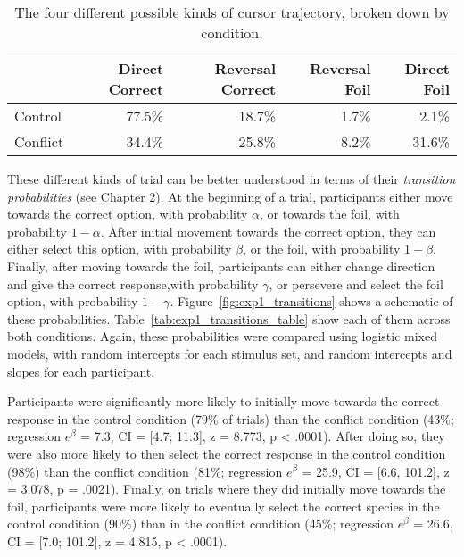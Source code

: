 \begin{table}
  \centering
  \begin{tabular}{lrrrr}
    \toprule
             & Direct Correct & Reversal Correct & Reversal Foil & Direct Foil\\
    \midrule
    Control  & 77.5\%         & 18.7\%           & 1.7\%         & 2.1\%\\
    Conflict & 34.4\%         & 25.8\%           & 8.2\%         & 31.6\%\\
    \bottomrule
  \end{tabular}
  \caption[Kinds of trajectory in Experiment 1.]{
    The four different possible kinds of cursor trajectory,
    broken down by condition.
    \label{tbl:exp1_trajectories}}
\end{table}

These different kinds of trial can be better understood
in terms of their \emph{transition probabilities} (see Chapter 2).
At the beginning of a trial, participants either move towards the correct option,
with probability $\alpha$, or towards the foil, with probability $1 - \alpha$.
After initial movement towards the correct option, they can either
select this option, with probability $\beta$, or the foil, with probability $1 - \beta$.
Finally, after moving towards the foil, participants can either
change direction and give the correct response,with probability $\gamma$,
or persevere and select the foil option, with probability $1 - \gamma$.
Figure~\ref{fig:exp1_transitions} shows
a schematic of these probabilities.
Table~\ref{tab:exp1_transitions_table}
show each of them across both conditions.
Again, these probabilities were compared using logistic mixed models,
with random intercepts for each stimulus set,
and random intercepts and slopes for each participant.

Participants were significantly more likely to
initially move towards the correct response in the control condition
(79\% of trials)
than the conflict condition (43\%;
regression $e^{\beta}$ = 7.3, CI = [4.7; 11.3], z = 8.773, p < .0001).
After doing so, they were also more likely to then select the correct response
in the control condition (98\%) than the conflict condition
(81\%; regression $e^{\beta}$ = 25.9, CI = [6.6, 101.2],
z = 3.078, p = .0021).\footnotemark
Finally, on trials where they did initially move towards the foil,
participants were more likely to eventually select the correct species
in the control condition (90\%)
than in the conflict condition (45\%;
regression $e^{\beta}$ = 26.6, CI = [7.0; 101.2], z = 4.815, p < .0001).

